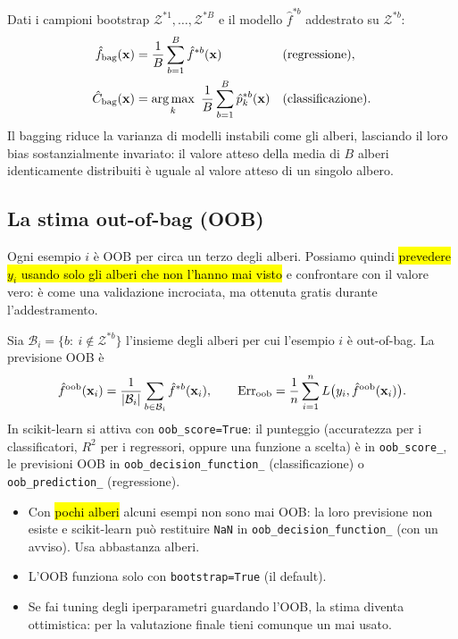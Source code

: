 \begin{tecnica}[Definizione]
Dati i campioni bootstrap $\mathcal{Z}^{*1},\dots,\mathcal{Z}^{*B}$ e il modello $\hat f^{*b}$ addestrato su $\mathcal{Z}^{*b}$:
\begin{align*}
\hat f_{\mathrm{bag}}(\mathbf{x})&=\frac1B\sum_{b=1}^{B}\hat f^{*b}(\mathbf{x}) &&\text{(regressione)},\\
\hat C_{\mathrm{bag}}(\mathbf{x})&=\operatorname*{arg\,max}_k\ \frac1B\sum_{b=1}^{B}\hat p^{*b}_k(\mathbf{x}) &&\text{(classificazione)}.
\end{align*}
Il bagging riduce la varianza di modelli instabili come gli alberi, lasciando il loro bias sostanzialmente invariato: il valore atteso della media di $B$ alberi identicamente distribuiti è uguale al valore atteso di un singolo albero.
\end{tecnica}

\subsection{La stima out-of-bag (OOB)}

Ogni esempio $i$ è OOB per circa un terzo degli alberi. Possiamo quindi \hl{prevedere $y_i$ usando solo gli alberi che non l'hanno mai visto} e confrontare con il valore vero: è come una validazione incrociata, ma ottenuta gratis durante l'addestramento.

\begin{tecnica}
Sia $\mathcal{B}_i=\{b:\ i\notin\mathcal{Z}^{*b}\}$ l'insieme degli alberi per cui l'esempio $i$ è out-of-bag. La previsione OOB è
\[
\hat f^{\mathrm{oob}}(\mathbf{x}_i)=\frac{1}{|\mathcal{B}_i|}\sum_{b\in\mathcal{B}_i}\hat f^{*b}(\mathbf{x}_i),
\qquad
\mathrm{Err}_{\mathrm{oob}}=\frac1n\sum_{i=1}^{n}L\big(y_i,\hat f^{\mathrm{oob}}(\mathbf{x}_i)\big).
\]
In scikit-learn si attiva con \texttt{oob\_score=True}: il punteggio (accuratezza per i classificatori, $R^2$ per i regressori, oppure una funzione a scelta) è in \texttt{oob\_score\_}, le previsioni OOB in \texttt{oob\_decision\_function\_} (classificazione) o \texttt{oob\_prediction\_} (regressione).
\end{tecnica}

\begin{attenzione}
\begin{itemize}
  \item Con \hl{pochi alberi} alcuni esempi non sono mai OOB: la loro previsione non esiste e scikit-learn può restituire \texttt{NaN} in \texttt{oob\_decision\_function\_} (con un avviso). Usa abbastanza alberi.
  \item L'OOB funziona solo con \texttt{bootstrap=True} (il default).
  \item Se fai tuning degli iperparametri guardando l'OOB, la stima diventa ottimistica: per la valutazione finale tieni comunque un  mai usato.
\end{itemize}
\end{attenzione}


